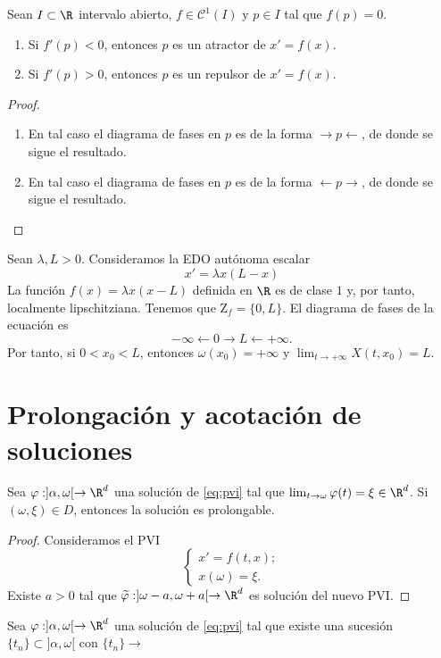 \documentclass{article}
\begin{document}
\begin{prop}
  Sean $I \subset \R$ intervalo abierto, $f \in \mathcal{C}^1(I)$ y $p\in I$ tal que $f(p) = 0$.
  
  \begin{enumerate}
  \item Si $f'(p) < 0$, entonces $p$ es un atractor de $x' = f(x)$.
  \item Si $f'(p) > 0$, entonces $p$ es un repulsor de $x' = f(x)$.
  \end{enumerate}
\end{prop}
\begin{proof}
  \begin{enumerate}
  \item En tal caso el diagrama de fases en $p$ es de la forma $\rightarrow p \leftarrow$, de donde
    se sigue el resultado.
  \item En tal caso el diagrama de fases en $p$ es de la forma $\leftarrow p \rightarrow$, de donde
    se sigue el resultado. \qedhere
  \end{enumerate}
\end{proof}

\begin{ex}
  Sean $\lambda, L > 0$. Consideramos la EDO autónoma escalar
\begin{equation}
\label{eq:log}
x' = \lambda x(L-x)
\end{equation}
La función $f(x) = \lambda x (x -L)$ definida en $\R$ es de clase $1$ y, por tanto, localmente lipschitziana. Tenemos que $\mathrm{Z}_f = \{0, L\}$. El diagrama de fases de la ecuación es
\[-\infty \leftarrow 0 \rightarrow  L \leftarrow +\infty.\]
Por tanto, si $0 < x_0 < L$, entonces $\omega(x_0) = +\infty$ y $\lim_{t \to +\infty} X(t,x_0) = L$.
\end{ex}


\section{Prolongación y acotación de soluciones}

\begin{lemma}
  Sea $\varphi : ]\alpha, \omega[ \to \R^d$ una solución de \eqref{eq:pvi} tal que $\lim_{t \to \omega} \varphi(t) = \xi \in \R^d$. Si $(\omega, \xi) \in D$, entonces la solución es prolongable.
\end{lemma}
\begin{proof}
  Consideramos el PVI
  \[\begin{cases}x' = f(t, x); \\ x(\omega) = \xi. \end{cases}\]
  Existe $a > 0$ tal que $\widetilde{\varphi}: ]\omega-a, \omega+a[ \to \R^d$ es solución del nuevo PVI.
\end{proof}

\begin{lemma}
  Sea $\varphi : ]\alpha, \omega[ \to \R^d$ una solución de \eqref{eq:pvi} tal que existe una sucesión $\{t_n\} \subset ]\alpha, \omega[$ con $\{t_n\} \to $
\end{lemma}
\end{document}
